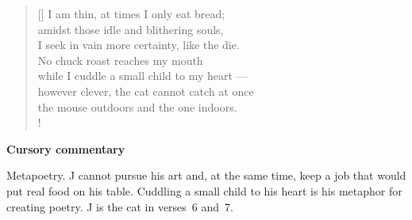 \documentclass[a4paper,12pt,twoside,final]{book}
\begin{document}
\newpage


\settowidth{\versewidth}{however clever, the cat cannot catch at once}

\begin{verse}[\versewidth]
  I am thin, at times I only eat bread; \\
  amidst those idle and blithering souls, \\
  I seek in vain more certainty, like the die. \\
  No chuck roast reaches my mouth \\
  while I cuddle a small child to my heart --- \\
  however clever, the cat cannot catch at once \\
  the mouse outdoors and the one indoors. \\!
\end{verse}


\bigskip

\noindent \textbf{Cursory commentary}

\medskip

Metapoetry. J cannot pursue his art and, at the same time, keep a job
that would put real food on his table. Cuddling a small child to his
heart is his metaphor for creating poetry. J is the cat in verses~6
and~7.

\newpage

\settowidth{\versewidth}{számhoz s szivemhez kisgyerek ---}
\end{document}
